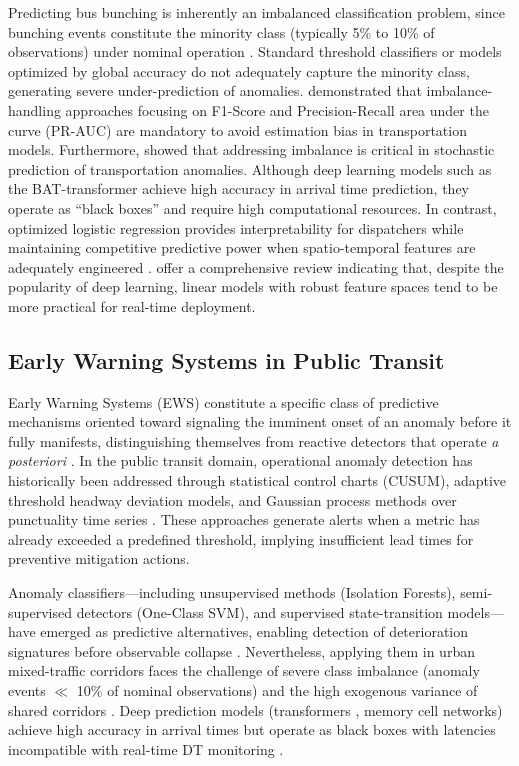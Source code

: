 \documentclass[fleqn,10pt,lineno]{wlpeerj}
\begin{document}
Predicting bus bunching is inherently an imbalanced classification problem, since bunching
events constitute the minority class (typically 5\% to 10\% of observations) under nominal
operation \citep{16}. Standard threshold classifiers or models optimized by global
accuracy do not adequately capture the minority class, generating severe under-prediction of
anomalies. \citet{17} demonstrated that imbalance-handling approaches focusing on F1-Score and
Precision-Recall area under the curve (PR-AUC) are mandatory to avoid estimation bias in
transportation models. Furthermore, \citet{18} showed that addressing imbalance is critical in
stochastic prediction of transportation anomalies. Although deep learning models such as the
BAT-transformer \citep{19} achieve high accuracy in arrival time prediction, they operate as
``black boxes'' and require high computational resources. In contrast, optimized logistic
regression provides interpretability for dispatchers while maintaining competitive predictive
power when spatio-temporal features are adequately engineered \citep{20}. \citet{21} offer a
comprehensive review indicating that, despite the popularity of deep learning, linear models
with robust feature spaces tend to be more practical for real-time deployment.

\subsection{Early Warning Systems in Public Transit}

Early Warning Systems (EWS) constitute a specific class of predictive mechanisms oriented
toward signaling the imminent onset of an anomaly before it fully manifests, distinguishing
themselves from reactive detectors that operate \textit{a posteriori} \citep{4}. In the
public transit domain, operational anomaly detection has historically been addressed through
statistical control charts (CUSUM), adaptive threshold headway deviation models, and Gaussian
process methods over punctuality time series \citep{8}. These approaches generate alerts when a
metric has already exceeded a predefined threshold, implying insufficient lead times for
preventive mitigation actions.

Anomaly classifiers---including unsupervised methods (Isolation Forests), semi-supervised
detectors (One-Class SVM), and supervised state-transition models---have emerged as predictive
alternatives, enabling detection of deterioration signatures before observable collapse
\citep{3}. Nevertheless, applying them in
urban mixed-traffic corridors faces the challenge of severe class imbalance (anomaly events
$\ll$ 10\% of nominal observations) and the high exogenous variance of shared corridors
\citep{16}. Deep prediction models (transformers \citep{19}, memory cell networks) achieve high
accuracy in arrival times but operate as black boxes with latencies incompatible with real-time
DT monitoring \citep{30}.
\end{document}
